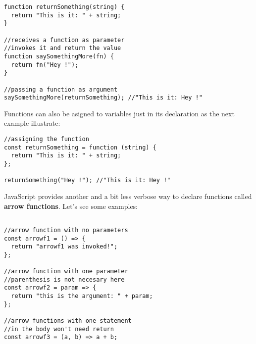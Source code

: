 \documentclass[a4paper, oneside, titlepage, 12pt]{book}
\begin{document}
\begin{verbatim}
function returnSomething(string) {
  return "This is it: " + string;
}

//receives a function as parameter
//invokes it and return the value
function saySomethingMore(fn) {
  return fn("Hey !");
}

//passing a function as argument
saySomethingMore(returnSomething); //"This is it: Hey !"
\end{verbatim}

Functions can also be asigned to variables just in its declaration as the next example illustrate:

\begin{verbatim}
//assigning the function
const returnSomething = function (string) {
  return "This is it: " + string;
};

returnSomething("Hey !"); //"This is it: Hey !"
\end{verbatim}



JavaScript provides another and a bit less verbose way to declare functions called \textbf{arrow functions}. Let's see some examples:

\begin{verbatim}
               
//arrow function with no parameters
const arrowf1 = () => {
  return "arrowf1 was invoked!";
};

//arrow function with one parameter
//parenthesis is not necesary here
const arrowf2 = param => {
  return "this is the argument: " + param;
};

//arrow functions with one statement 
//in the body won't need return 
const arrowf3 = (a, b) => a + b;
\end{verbatim}
\end{document}
